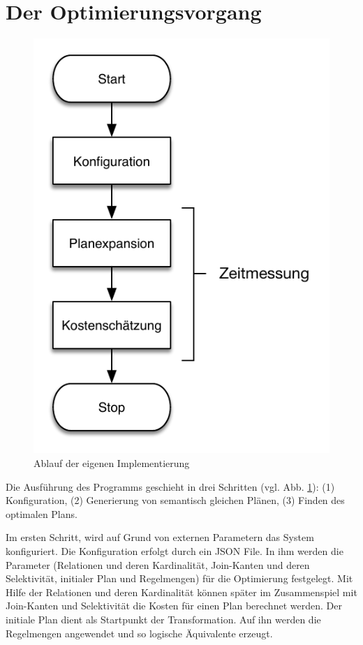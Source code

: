 \section{Der Optimierungsvorgang}

\begin{figure}[h]
  \centering
  \includegraphics[scale=0.8]{04_Implementierung/00_media/Ablauf.pdf}
  \caption{Ablauf der eigenen Implementierung}
  \label{Ablauf}
\end{figure}

Die Ausführung des Programms geschieht in drei Schritten (vgl. Abb. \ref{Ablauf}): (1) Konfiguration, (2) Generierung von semantisch gleichen Plänen, (3) Finden des optimalen Plans.




Im ersten Schritt, wird auf Grund von externen Parametern das System konfiguriert. Die Konfiguration erfolgt durch ein JSON File. In ihm werden die Parameter (Relationen und deren Kardinalität, Join-Kanten und deren Selektivität, initialer Plan und Regelmengen) für die Optimierung festgelegt. Mit Hilfe der Relationen und deren Kardinalität können später im Zusammenspiel mit Join-Kanten und Selektivität die Kosten für einen Plan berechnet werden. Der initiale Plan dient als Startpunkt der Transformation. Auf ihn werden die Regelmengen angewendet und so logische  Äquivalente erzeugt.

